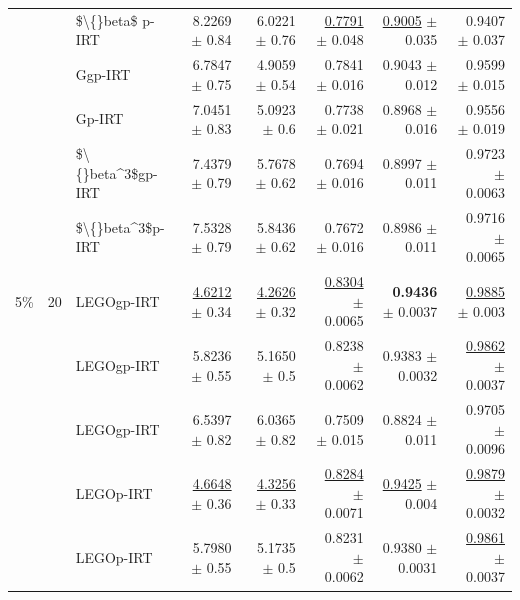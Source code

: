 \begin{longtable}{llp{}rrrrr}
 &  & \$\textbackslash\{\}beta\$ p-IRT & 8.2269 {\scriptsize $\pm$ 0.84} & 6.0221 {\scriptsize $\pm$ 0.76} & \underline{0.7791} {\scriptsize $\pm$ 0.048} & \underline{0.9005} {\scriptsize $\pm$ 0.035} & 0.9407 {\scriptsize $\pm$ 0.037} \\
 &  & Ggp-IRT & 6.7847 {\scriptsize $\pm$ 0.75} & 4.9059 {\scriptsize $\pm$ 0.54} & 0.7841 {\scriptsize $\pm$ 0.016} & 0.9043 {\scriptsize $\pm$ 0.012} & 0.9599 {\scriptsize $\pm$ 0.015} \\
 &  & Gp-IRT & 7.0451 {\scriptsize $\pm$ 0.83} & 5.0923 {\scriptsize $\pm$ 0.6} & 0.7738 {\scriptsize $\pm$ 0.021} & 0.8968 {\scriptsize $\pm$ 0.016} & 0.9556 {\scriptsize $\pm$ 0.019} \\
 &  & \$\textbackslash\{\}beta\textasciicircum{}3\$gp-IRT & 7.4379 {\scriptsize $\pm$ 0.79} & 5.7678 {\scriptsize $\pm$ 0.62} & 0.7694 {\scriptsize $\pm$ 0.016} & 0.8997 {\scriptsize $\pm$ 0.011} & 0.9723 {\scriptsize $\pm$ 0.0063} \\
 &  & \$\textbackslash\{\}beta\textasciicircum{}3\$p-IRT & 7.5328 {\scriptsize $\pm$ 0.79} & 5.8436 {\scriptsize $\pm$ 0.62} & 0.7672 {\scriptsize $\pm$ 0.016} & 0.8986 {\scriptsize $\pm$ 0.011} & 0.9716 {\scriptsize $\pm$ 0.0065} \\
\midrule
5\% & 20 & LEGOgp-IRT & \underline{4.6212} {\scriptsize $\pm$ 0.34} & \underline{4.2626} {\scriptsize $\pm$ 0.32} & \underline{0.8304} {\scriptsize $\pm$ 0.0065} & \textbf{0.9436} {\scriptsize $\pm$ 0.0037} & \underline{0.9885} {\scriptsize $\pm$ 0.003} \\
 &  & LEGOgp-IRT & 5.8236 {\scriptsize $\pm$ 0.55} & 5.1650 {\scriptsize $\pm$ 0.5} & 0.8238 {\scriptsize $\pm$ 0.0062} & 0.9383 {\scriptsize $\pm$ 0.0032} & \underline{0.9862} {\scriptsize $\pm$ 0.0037} \\
 &  & LEGOgp-IRT & 6.5397 {\scriptsize $\pm$ 0.82} & 6.0365 {\scriptsize $\pm$ 0.82} & 0.7509 {\scriptsize $\pm$ 0.015} & 0.8824 {\scriptsize $\pm$ 0.011} & 0.9705 {\scriptsize $\pm$ 0.0096} \\
 &  & LEGOp-IRT & \underline{4.6648} {\scriptsize $\pm$ 0.36} & \underline{4.3256} {\scriptsize $\pm$ 0.33} & \underline{0.8284} {\scriptsize $\pm$ 0.0071} & \underline{0.9425} {\scriptsize $\pm$ 0.004} & \underline{0.9879} {\scriptsize $\pm$ 0.0032} \\
 &  & LEGOp-IRT & 5.7980 {\scriptsize $\pm$ 0.55} & 5.1735 {\scriptsize $\pm$ 0.5} & 0.8231 {\scriptsize $\pm$ 0.0062} & 0.9380 {\scriptsize $\pm$ 0.0031} & \underline{0.9861} {\scriptsize $\pm$ 0.0037} \\

\end{longtable}
